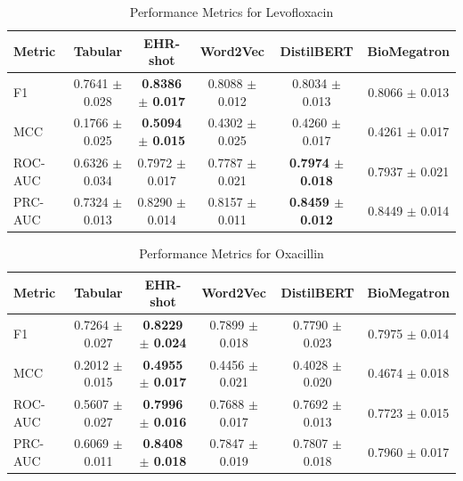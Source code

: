 \documentclass{article}
\theoremstyle{plain}
\theoremstyle{definition}
\theoremstyle{remark}
\begin{document}

\begin{table}[h!]
\caption{Performance Metrics for Levofloxacin}
\label{table-levofloxacin}
\vskip 0.15in
\begin{center}
\begin{small}
\begin{sc}
\begin{adjustbox}{width=5in}
\begin{tabular}{l| ccccc}
\toprule
Metric & Tabular & EHR-shot & Word2Vec & DistilBERT & BioMegatron \\
\midrule
F1 & 0.7641 $\pm$ 0.028 & \textbf{0.8386 $\pm$ 0.017} & 0.8088 $\pm$ 0.012 & 0.8034 $\pm$ 0.013 & 0.8066 $\pm$ 0.013 \\
MCC & 0.1766 $\pm$ 0.025 & \textbf{0.5094 $\pm$ 0.015} & 0.4302 $\pm$ 0.025 & 0.4260 $\pm$ 0.017 & 0.4261 $\pm$ 0.017 \\
ROC-AUC & 0.6326 $\pm$ 0.034 & 0.7972 $\pm$ 0.017 & 0.7787 $\pm$ 0.021 & \textbf{0.7974 $\pm$ 0.018} & 0.7937 $\pm$ 0.021 \\
PRC-AUC & 0.7324 $\pm$ 0.013 & 0.8290 $\pm$ 0.014 & 0.8157 $\pm$ 0.011 & \textbf{0.8459 $\pm$ 0.012} & 0.8449 $\pm$ 0.014 \\
\bottomrule
\end{tabular}
\end{adjustbox}
\end{sc}
\end{small}
\end{center}
\vskip -0.1in
\end{table}


\begin{table}[h!]
\caption{Performance Metrics for Oxacillin}
\label{table-oxacillin}
\vskip 0.15in
\begin{center}
\begin{small}
\begin{sc}
\begin{adjustbox}{width=5in}
\begin{tabular}{l| ccccc}
\toprule
Metric & Tabular & EHR-shot & Word2Vec & DistilBERT & BioMegatron \\
\midrule
F1 & 0.7264 $\pm$ 0.027 & \textbf{0.8229 $\pm$ 0.024} & 0.7899 $\pm$ 0.018 & 0.7790 $\pm$ 0.023 & 0.7975 $\pm$ 0.014 \\
MCC & 0.2012 $\pm$ 0.015 & \textbf{0.4955 $\pm$ 0.017} & 0.4456 $\pm$ 0.021 & 0.4028 $\pm$ 0.020 & 0.4674 $\pm$ 0.018 \\
ROC-AUC & 0.5607 $\pm$ 0.027 & \textbf{0.7996 $\pm$ 0.016} & 0.7688 $\pm$ 0.017 & 0.7692 $\pm$ 0.013 & 0.7723 $\pm$ 0.015 \\
PRC-AUC & 0.6069 $\pm$ 0.011 & \textbf{0.8408 $\pm$ 0.018} & 0.7847 $\pm$ 0.019 & 0.7807 $\pm$ 0.018 & 0.7960 $\pm$ 0.017 \\
\bottomrule
\end{tabular}
\end{adjustbox}
\end{sc}
\end{small}
\end{center}
\vskip -0.1in
\end{table}
\end{document}
